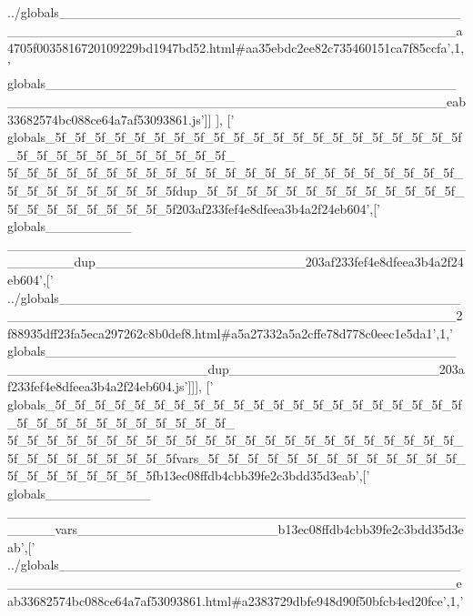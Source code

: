 \begin{DoxyCode}
{      ../globals\_\_\_\_\_\_\_\_\_\_\_\_\_\_\_\_\_\_\_\_\_\_\_\_\_\_\_\_\_\_\_\_\_\_\_\_\_\_\_\_\_\_\_\_\_\_\_\_\_\_\_\_\_\_\_\_\_\_\_\_\_\_\_\_\_\_\_\_\_\_\_\_\_\_\_\_\_\_\_\_\_\_\_\_\_\_\_\_\_a4705f0035816720109229bd1947bd52.html#aa35ebdc2ee82c735460151ca7f85ccfa'},1,\textcolor{stringliteral}{'
      globals\_\_\_\_\_\_\_\_\_\_\_\_\_\_\_\_\_\_\_\_\_\_\_\_\_\_\_\_\_\_\_\_\_\_\_\_\_\_\_\_\_\_\_\_\_\_\_\_\_\_\_\_\_\_\_\_\_\_\_\_\_\_\_\_\_\_\_\_\_\_\_\_\_\_\_\_\_\_\_\_\_\_\_\_\_\_\_\_\_eab33682574bc088ce64a7af53093861.js'}]]
      ],
  [\textcolor{stringliteral}{'
      globals\_5f\_5f\_5f\_5f\_5f\_5f\_5f\_5f\_5f\_5f\_5f\_5f\_5f\_5f\_5f\_5f\_5f\_5f\_5f\_5f\_5f\_5f\_5f\_5f\_5f\_5f\_5f\_5f\_5f\_5f\_5f\_5f\_
      5f\_5f\_5f\_5f\_5f\_5f\_5f\_5f\_5f\_5f\_5f\_5f\_5f\_5f\_5f\_5f\_5f\_5f\_5f\_5f\_5f\_5f\_5f\_5f\_5f\_5f\_5f\_5f\_5f\_5f\_5f\_5fdup\_5f\_5f\_5f\_5f\_5f\_5f\_5f\_5f\_5f\_5f\_5f\_5f\_5f\_5f\_5f\_5f\_5f\_5f\_5f\_5f\_5f\_5f203af233fef4e8dfeea3b4a2f24eb604'},[\textcolor{stringliteral}{'
      globals\_\_\_\_\_\_\_\_\_
      \_\_\_\_\_\_\_\_\_\_\_\_\_\_\_\_\_\_\_\_\_\_\_\_\_\_\_\_\_\_\_\_\_\_\_\_\_\_\_\_\_\_\_\_\_\_\_\_\_\_\_\_\_\_\_dup\_\_\_\_\_\_\_\_\_\_\_\_\_\_\_\_\_\_\_\_\_\_203af233fef4e8dfeea3b4a2f24eb604'},[\textcolor{stringliteral}{'
      ../globals\_\_\_\_\_\_\_\_\_\_\_\_\_\_\_\_\_\_\_\_\_\_\_\_\_\_\_\_\_\_\_\_\_\_\_\_\_\_\_\_\_\_\_\_\_\_\_\_\_\_\_\_\_\_\_\_\_\_\_\_\_\_\_\_\_\_\_\_\_\_\_\_\_\_\_\_\_\_\_\_\_\_\_\_\_\_\_\_\_2f88935dff23fa5eca297262c8b0def8.html#a5a27332a5a2cffe78d778c0eec1e5da1'},1,\textcolor{stringliteral}{'
      globals\_\_\_\_\_\_\_\_\_\_\_\_\_\_\_\_\_\_\_\_\_\_\_\_\_\_\_\_\_\_\_\_\_\_\_\_\_\_\_\_\_\_\_\_\_\_\_\_\_\_\_\_\_\_\_\_\_\_\_\_\_\_\_\_dup\_\_\_\_\_\_\_\_\_\_\_\_\_\_\_\_\_\_\_\_\_\_203af233fef4e8dfeea3b4a2f24eb604.js'}]]],
  [\textcolor{stringliteral}{'
      globals\_5f\_5f\_5f\_5f\_5f\_5f\_5f\_5f\_5f\_5f\_5f\_5f\_5f\_5f\_5f\_5f\_5f\_5f\_5f\_5f\_5f\_5f\_5f\_5f\_5f\_5f\_5f\_5f\_5f\_5f\_5f\_5f\_
      5f\_5f\_5f\_5f\_5f\_5f\_5f\_5f\_5f\_5f\_5f\_5f\_5f\_5f\_5f\_5f\_5f\_5f\_5f\_5f\_5f\_5f\_5f\_5f\_5f\_5f\_5f\_5f\_5f\_5f\_5f\_5fvars\_5f\_5f\_5f\_5f\_5f\_5f\_5f\_5f\_5f\_5f\_5f\_5f\_5f\_5f\_5f\_5f\_5f\_5f\_5f\_5f\_5fb13ec08ffdb4cbb39fe2c3bdd35d3eab'},[\textcolor{stringliteral}{'
      globals\_\_\_\_\_\_\_\_\_\_\_
      \_\_\_\_\_\_\_\_\_\_\_\_\_\_\_\_\_\_\_\_\_\_\_\_\_\_\_\_\_\_\_\_\_\_\_\_\_\_\_\_\_\_\_\_\_\_\_\_\_\_\_\_\_vars\_\_\_\_\_\_\_\_\_\_\_\_\_\_\_\_\_\_\_\_\_b13ec08ffdb4cbb39fe2c3bdd35d3eab'},[\textcolor{stringliteral}{'
      ../globals\_\_\_\_\_\_\_\_\_\_\_\_\_\_\_\_\_\_\_\_\_\_\_\_\_\_\_\_\_\_\_\_\_\_\_\_\_\_\_\_\_\_\_\_\_\_\_\_\_\_\_\_\_\_\_\_\_\_\_\_\_\_\_\_\_\_\_\_\_\_\_\_\_\_\_\_\_\_\_\_\_\_\_\_\_\_\_\_\_eab33682574bc088ce64a7af53093861.html#a2383729dbfe948d90f50bfcb4ed20fce'},1,\textcolor{stringliteral}{'
}
\end{DoxyCode}
